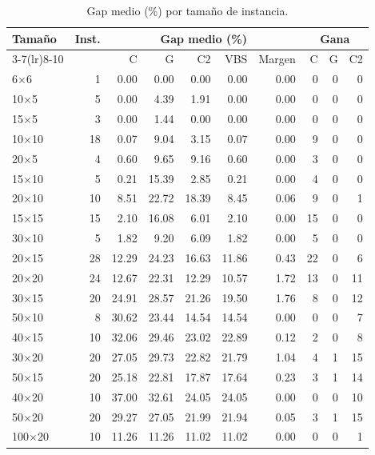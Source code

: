 \begin{table}[H]
  \centering
  \small
  \singlespacing
  \caption{Gap medio (\%) por tamaño de instancia.}
  \label{tab:por_tamano}
  \begin{tabular}{lrrrrrrrrr}
    \toprule
    Tamaño & Inst. & \multicolumn{5}{c}{Gap medio (\%)} & \multicolumn{3}{c}{Gana} \\
    \cmidrule(lr){3-7}\cmidrule(lr){8-10}
     &  & C & G & C2 & VBS & Margen & C & G & C2 \\
    \midrule
    6$\times$6 & 1 & 0.00 & 0.00 & 0.00 & 0.00 & 0.00 & 0 & 0 & 0 \\
    10$\times$5 & 5 & 0.00 & 4.39 & 1.91 & 0.00 & 0.00 & 0 & 0 & 0 \\
    15$\times$5 & 3 & 0.00 & 1.44 & 0.00 & 0.00 & 0.00 & 0 & 0 & 0 \\
    10$\times$10 & 18 & 0.07 & 9.04 & 3.15 & 0.07 & 0.00 & 9 & 0 & 0 \\
    20$\times$5 & 4 & 0.60 & 9.65 & 9.16 & 0.60 & 0.00 & 3 & 0 & 0 \\
    15$\times$10 & 5 & 0.21 & 15.39 & 2.85 & 0.21 & 0.00 & 4 & 0 & 0 \\
    20$\times$10 & 10 & 8.51 & 22.72 & 18.39 & 8.45 & 0.06 & 9 & 0 & 1 \\
    15$\times$15 & 15 & 2.10 & 16.08 & 6.01 & 2.10 & 0.00 & 15 & 0 & 0 \\
    30$\times$10 & 5 & 1.82 & 9.20 & 6.09 & 1.82 & 0.00 & 5 & 0 & 0 \\
    20$\times$15 & 28 & 12.29 & 24.23 & 16.63 & 11.86 & 0.43 & 22 & 0 & 6 \\
    20$\times$20 & 24 & 12.67 & 22.31 & 12.29 & 10.57 & 1.72 & 13 & 0 & 11 \\
    30$\times$15 & 20 & 24.91 & 28.57 & 21.26 & 19.50 & 1.76 & 8 & 0 & 12 \\
    50$\times$10 & 8 & 30.62 & 23.44 & 14.54 & 14.54 & 0.00 & 0 & 0 & 7 \\
    40$\times$15 & 10 & 32.06 & 29.46 & 23.02 & 22.89 & 0.12 & 2 & 0 & 8 \\
    30$\times$20 & 20 & 27.05 & 29.73 & 22.82 & 21.79 & 1.04 & 4 & 1 & 15 \\
    50$\times$15 & 20 & 25.18 & 22.81 & 17.87 & 17.64 & 0.23 & 3 & 1 & 14 \\
    40$\times$20 & 10 & 37.00 & 32.61 & 24.05 & 24.05 & 0.00 & 0 & 0 & 10 \\
    50$\times$20 & 20 & 29.27 & 27.05 & 21.99 & 21.94 & 0.05 & 3 & 1 & 15 \\
    100$\times$20 & 10 & 11.26 & 11.26 & 11.02 & 11.02 & 0.00 & 0 & 0 & 1 \\
    \bottomrule
  \end{tabular}
  \par\vspace{2pt}{\footnotesize C: Chuffed; G: Gecode; C2: Chuffed V2. Margen: gap de la mejor configuración individual del grupo menos gap del VBS.}
\end{table}
